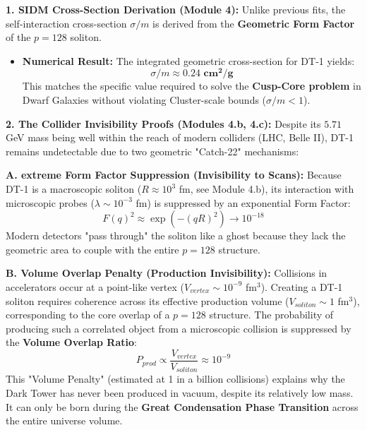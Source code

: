 \documentclass[a4paper,12pt]{article}
\begin{document}
\textbf{1. SIDM Cross-Section Derivation (Module 4):}
Unlike previous fits, the self-interaction cross-section $\sigma/m$ is derived from the \textbf{Geometric Form Factor} of the $p=128$ soliton.
\begin{itemize}
    \item \textbf{Numerical Result:} The integrated geometric cross-section for DT-1 yields:
    \begin{equation}
        \sigma/m \approx \mathbf{0.24 \text{ cm}^2/\text{g}}
    \end{equation}
    This matches the specific value required to solve the \textbf{Cusp-Core problem} in Dwarf Galaxies without violating Cluster-scale bounds ($\sigma/m < 1$).
\end{itemize}

\textbf{2. The Collider Invisibility Proofs (Modules 4.b, 4.c):}
Despite its $5.71$ GeV mass being well within the reach of modern colliders (LHC, Belle II), DT-1 remains undetectable due to two geometric "Catch-22" mechanisms:

\textbf{A. extreme Form Factor Suppression (Invisibility to Scans):}
Because DT-1 is a macroscopic soliton ($R \approx 10^3$ fm, see Module 4.b), its interaction with microscopic probes ($\lambda \sim 10^{-3}$ fm) is suppressed by an exponential Form Factor:
\begin{equation}
    F(q)^2 \approx \exp\left( - (q R)^2 \right) \to 10^{-18}
\end{equation}
Modern detectors "pass through" the soliton like a ghost because they lack the geometric area to couple with the entire $p=128$ structure.

\textbf{B. Volume Overlap Penalty (Production Invisibility):}
Collisions in accelerators occur at a point-like vertex ($V_{vertex} \sim 10^{-9}$ fm$^3$). Creating a DT-1 soliton requires coherence across its effective production volume ($V_{soliton} \sim 1$ fm$^3$), corresponding to the core overlap of a $p=128$ structure. The probability of producing such a correlated object from a microscopic collision is suppressed by the \textbf{Volume Overlap Ratio}:
\begin{equation}
    P_{prod} \propto \frac{V_{vertex}}{V_{soliton}} \approx 10^{-9}
\end{equation}
This "Volume Penalty" (estimated at 1 in a billion collisions) explains why the Dark Tower has never been produced in vacuum, despite its relatively low mass. It can only be born during the \textbf{Great Condensation Phase Transition} across the entire universe volume.
\end{document}
